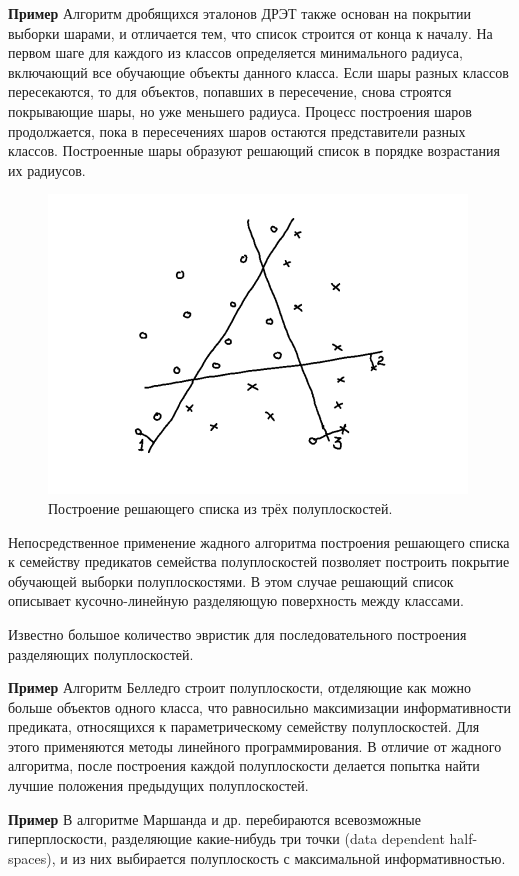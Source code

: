 \textbf{Пример} Алгоритм дробящихся эталонов ДРЭТ также основан на покрытии выборки шарами, и отличается тем, что список строится от конца к началу. На первом шаге для каждого из классов определяется минимального радиуса, включающий все обучающие объекты данного класса. Если шары разных классов
пересекаются, то для объектов, попавших в пересечение, снова строятся покрывающие шары, но уже меньшего радиуса. Процесс построения шаров продолжается, пока в пересечениях шаров остаются представители разных классов. Построенные шары образуют решающий список в порядке возрастания их радиусов.

\begin{figure}[h!] \centering \includegraphics{chapters/logical/images/logical.png} \caption{Построение решающего списка из трёх полуплоскостей.} \end{figure}

Непосредственное применение жадного алгоритма построения решающего списка к семейству предикатов семейства полуплоскостей позволяет построить покрытие обучающей выборки полуплоскостями. В этом случае решающий список описывает кусочно-линейную разделяющую поверхность между классами.

Известно большое количество эвристик для последовательного построения разделяющих полуплоскостей.

\textbf{Пример} Алгоритм Белледго строит полуплоскости, отделяющие как можно больше объектов одного класса, что равносильно максимизации информативности предиката, относящихся к параметрическому семейству полуплоскостей. Для этого применяются методы линейного программирования. В отличие от жадного алгоритма, после построения каждой полуплоскости делается попытка найти лучшие положения предыдущих полуплоскостей.

\textbf{Пример} В алгоритме Маршанда и др. перебираются всевозможные гиперплоскости, разделяющие какие-нибудь три точки (data dependent half-spaces), и из них выбирается полуплоскость с максимальной информативностью.

